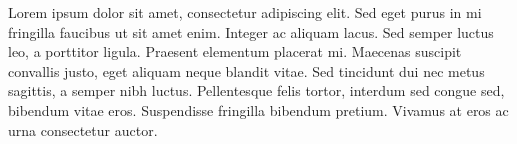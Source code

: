 Lorem ipsum dolor sit amet, consectetur adipiscing elit. Sed eget purus in mi fringilla faucibus ut sit amet enim. Integer ac aliquam lacus. Sed semper luctus leo, a porttitor ligula. Praesent elementum placerat mi. Maecenas suscipit convallis justo, eget aliquam neque blandit vitae. Sed tincidunt dui nec metus sagittis, a semper nibh luctus. Pellentesque felis tortor, interdum sed congue sed, bibendum vitae eros. Suspendisse fringilla bibendum pretium. Vivamus at eros ac urna consectetur auctor.

